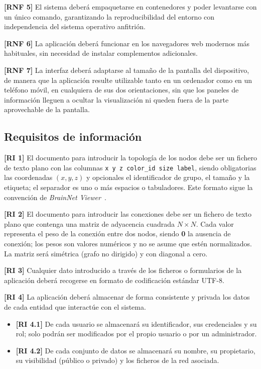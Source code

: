 \noindent\textbf{[RNF 5]} El sistema deberá empaquetarse en contenedores y poder levantarse con un
único comando, garantizando la reproducibilidad del entorno con independencia del sistema operativo
anfitrión.

\noindent\textbf{[RNF 6]} La aplicación deberá funcionar en los navegadores web modernos más
habituales, sin necesidad de instalar complementos adicionales.

\noindent\textbf{[RNF 7]} La interfaz deberá adaptarse al tamaño de la pantalla del dispositivo, de
manera que la aplicación resulte utilizable tanto en un ordenador como en un teléfono móvil, en
cualquiera de sus dos orientaciones, sin que los paneles de información lleguen a ocultar la
visualización ni queden fuera de la parte aprovechable de la pantalla.

\subsection{Requisitos de información}

\noindent\textbf{[RI 1]} El documento para introducir la topología de los nodos debe ser un fichero
de texto plano con las columnas \texttt{x  y  z  color\_id  size  label}, siendo obligatorias las
coordenadas $(x, y, z)$ y opcionales el identificador de grupo, el tamaño y la etiqueta; el separador
es uno o más espacios o tabuladores. Este formato sigue la convención de \textit{BrainNet
Viewer}~\cite{brainnet}.

\noindent\textbf{[RI 2]} El documento para introducir las conexiones debe ser un fichero de texto
plano que contenga una matriz de adyacencia cuadrada $N \times N$. Cada valor representa el peso de
la conexión entre dos nodos, siendo \textbf{0} la ausencia de conexión; los pesos son valores
numéricos y no se asume que estén normalizados. La matriz será simétrica (grafo no dirigido) y con
diagonal a cero.

\noindent\textbf{[RI 3]} Cualquier dato introducido a través de los ficheros o formularios de la
aplicación deberá recogerse en formato de codificación estándar UTF-8.

\noindent\textbf{[RI 4]} La aplicación deberá almacenar de forma consistente y privada los datos de
cada entidad que interactúe con el sistema.
\begin{itemize}
	\item \textbf{[RI 4.1]} De cada usuario se almacenará su identificador, sus credenciales y su rol;
		solo podrán ser modificados por el propio usuario o por un administrador.
	\item \textbf{[RI 4.2]} De cada conjunto de datos se almacenará su nombre, su propietario, su
		visibilidad (público o privado) y los ficheros de la red asociada.
\end{itemize}

